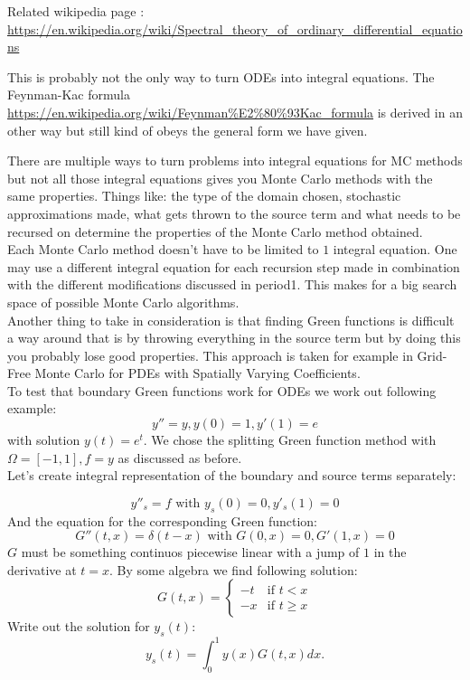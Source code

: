 \documentclass[a4paper,12pt]{article}
\begin{document}
Related wikipedia page :
\url{https://en.wikipedia.org/wiki/Spectral_theory_of_ordinary_differential_equations}

This is probably not the only way to turn ODEs into integral equations. The Feynman-Kac formula
\url{https://en.wikipedia.org/wiki/Feynman%E2%80%93Kac_formula} 
is derived in an other way but still kind of obeys the general form we have given.

There are multiple ways to turn problems into integral equations for MC methods
but not all those integral equations gives you Monte Carlo methods with the same properties.
Things like: the type of the domain chosen, stochastic approximations made, what gets thrown
to the source term and what needs to be recursed on determine the properties of the Monte
Carlo method obtained.\\

Each Monte Carlo method doesn't have to be limited to $1$ integral equation.
One may use a different integral equation for each recursion step made in combination
with the different modifications discussed in period1. This makes for a big search space
of possible Monte Carlo algorithms. \\


Another thing to take in consideration is that finding Green functions is difficult a way
around that is by throwing everything in the source term but by doing this you probably
lose good properties. This approach is taken for example in Grid-Free Monte Carlo for
PDEs with Spatially Varying Coefficients. \\

To test that boundary Green functions work for ODEs we work out following example:
$$
    y'' = y, y(0) = 1, y'(1)=e
$$
with solution $y(t) = e^{t}$. We chose the splitting Green function method with
$\Omega = [-1,1],f = y$ as discussed as before. \\

Let's create integral representation of the boundary and source terms separately:

$$
    y''_{s} = f \text{ with } y_s(0)=0, y'_s(1)=0
$$
And the equation for the corresponding Green function:
$$
    G''(t,x) = \delta(t-x) \text{ with } G(0,x)=0, G'(1,x)=0
$$
$G$ must be something continuos piecewise linear with a jump of $1$ in the derivative
at $t = x$. By some algebra we find following solution:
$$
    G(t,x) =
    \begin{cases}
        -t & \text{if } t <  x   \\
        -x & \text{if } t \ge  x
    \end{cases}
$$
Write out the solution for $y_{s}(t)$:
$$
    y_{s}(t) = \int_{0}^{1} y(x) G(t,x) dx.
$$
\end{document}

